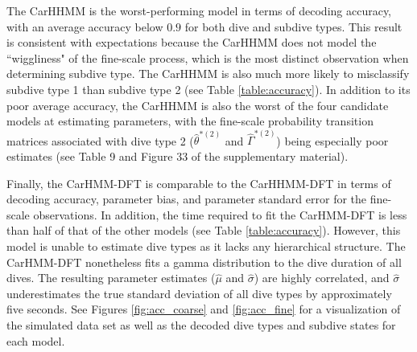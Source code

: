 The CarHHMM is the worst-performing model in terms of decoding accuracy, with an average accuracy below $0.9$ for both dive and subdive types. This result is consistent with expectations because the CarHHMM does not model the ``wiggliness" of the fine-scale process, which is the most distinct observation when determining subdive type. The CarHHMM is also much more likely to misclassify subdive type 1 than subdive type 2 (see Table \ref{table:accuracy}). In addition to its poor average accuracy, the CarHHMM is also the worst of the four candidate models at estimating parameters, with the fine-scale probability transition matrices associated with dive type 2 ($\hat \theta^{*(2)}$ and $\hat \Gamma^{*(2)}$) being especially poor estimates (see Table 9 and Figure 33 of the supplementary material).

Finally, the CarHMM-DFT is comparable to the CarHHMM-DFT in terms of decoding accuracy, parameter bias, and parameter standard error for the fine-scale observations. In addition, the time required to fit the CarHMM-DFT is less than half of that of the other models (see Table \ref{table:accuracy}). However, this model is unable to estimate dive types as it lacks any hierarchical structure. The CarHMM-DFT nonetheless fits a gamma distribution to the dive duration of all dives. The resulting parameter estimates ($\hat \mu$ and $\hat \sigma$) are highly correlated, and $\hat \sigma$ underestimates the true standard deviation of all dive types by approximately five seconds. See Figures \ref{fig:acc_coarse} and \ref{fig:acc_fine} for a visualization of the simulated data set as well as the decoded dive types and subdive states for each model.